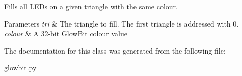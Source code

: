 Fills all L\+E\+Ds on a given triangle with the same colour. 


\begin{DoxyParams}{Parameters}
{\em tri} & The triangle to fill. The first triangle is addressed with 0. \\
\hline
{\em colour} & A 32-\/bit Glow\+Bit colour value \\
\hline
\end{DoxyParams}


The documentation for this class was generated from the following file\+:\begin{DoxyCompactItemize}
\item 
glowbit.\+py\end{DoxyCompactItemize}
